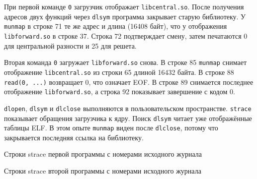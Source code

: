 \documentclass[12pt,a4paper]{article}
\begin{document}
При первой команде \texttt{0} загрузчик отображает \texttt{libcentral.so}. После получения адресов двух функций через \texttt{dlsym} программа закрывает старую библиотеку. У \texttt{munmap} в строке 71 те же адрес и длина (16408 байт), что у отображения \texttt{libforward.so} в строке 37. Строка 72 подтверждает смену, затем печатаются 0 для центральной разности и 25 для решета.

Вторая команда \texttt{0} загружает \texttt{libforward.so} снова. В строке 85 \texttt{munmap} снимает отображение \texttt{libcentral.so} из строки 65 длиной 16432 байта. В строке 88 \texttt{read(0, ...)} возвращает 0, что означает EOF. В строке 89 снимается последнее отображение \texttt{libforward.so}, а строка 92 показывает завершение с кодом 0.

\texttt{dlopen}, \texttt{dlsym} и \texttt{dlclose} выполняются в пользовательском пространстве. \texttt{strace} показывает обращения загрузчика к ядру. Поиск \texttt{dlsym} читает уже отображённые таблицы ELF. В этом опыте \texttt{munmap} виден после \texttt{dlclose}, потому что закрывается последняя ссылка на библиотеку.

\clearpage
\begin{listingblock}{Строки strace первой программы с номерами исходного журнала}
\end{listingblock}
\begin{listingblock}{Строки strace второй программы с номерами исходного журнала}
\end{listingblock}

\clearpage
\end{document}
